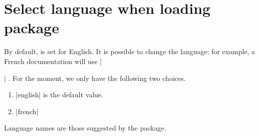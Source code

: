 \documentclass[10pt, a4paper]{article}
\begin{document}
\section{Select language when loading package}

By default,  is set for English. It is possible to change the language: for example, a French documentation will use \tdocinlatex|\usepackage[lang = french]{tutodoc}| .
For the moment, we only have the following two choices.

\begin{enumerate}
    \item \tdocinlatex|english| is the default value.

    \item \tdocinlatex|french|
\end{enumerate}


\begin{tdocnote}
	Language names are those suggested by the  package.
\end{tdocnote}
\end{document}
